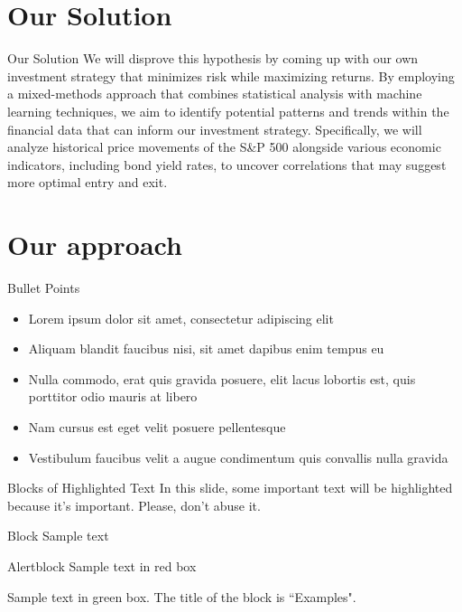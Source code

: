 \documentclass[aspectratio=169,xcolor=dvipsnames]{beamer}
\begin{document}
\section{Our Solution}
\begin{frame}{Our Solution}
	We will disprove this hypothesis by coming up with our own investment strategy that minimizes risk while maximizing returns. By employing a mixed-methods approach that combines statistical analysis with machine learning techniques, we aim to identify potential patterns and trends within the financial data that can inform our investment strategy. Specifically, we will analyze historical price movements of the S\&P 500 alongside various economic indicators, including bond yield rates, to uncover correlations that may suggest more optimal entry and exit.
\end{frame}
\section{Our approach}

\begin{frame}{Bullet Points}

	\begin{itemize}
		\item Lorem ipsum dolor sit amet, consectetur adipiscing elit
		\item Aliquam blandit faucibus nisi, sit amet dapibus enim tempus eu
		\item Nulla commodo, erat quis gravida posuere, elit lacus lobortis est, quis porttitor odio mauris at libero
		\item Nam cursus est eget velit posuere pellentesque
		\item Vestibulum faucibus velit a augue condimentum quis convallis nulla gravida
	\end{itemize}
\end{frame}



\begin{frame}{Blocks of Highlighted Text}
	In this slide, some important text will be \alert{highlighted} because it's important. Please, don't abuse it.

	\begin{block}{Block}
		Sample text
	\end{block}

	\begin{alertblock}{Alertblock}
		Sample text in red box
	\end{alertblock}

	\begin{examples}
		Sample text in green box. The title of the block is ``Examples".
	\end{examples}
\end{frame}
\end{document}
